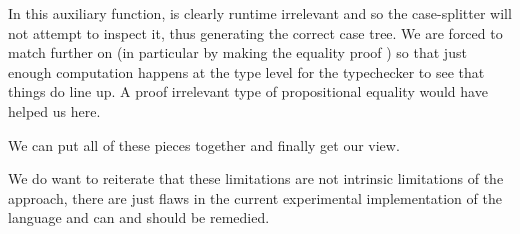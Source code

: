 In this auxiliary function,  is clearly runtime irrelevant and
so the case-splitter will not attempt to inspect it, thus generating the correct
case tree.
%
We are forced to match further on  (in particular by making
the equality proof ) so that just enough computation happens
at the type level for the typechecker to see that things do line up.
%
A proof irrelevant type of propositional equality would have helped us here.

We can put all of these pieces together and finally get our
 view.


We do want to reiterate that these limitations are not intrinsic limitations of
the approach, there are just flaws in the current experimental implementation of
the \idris{} language and can and should be remedied.
